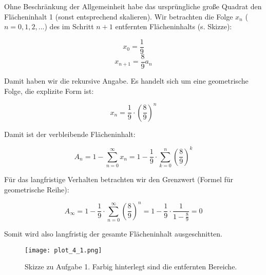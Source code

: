 \item Ohne Beschränkung der Allgemeinheit habe das ursprüngliche große Quadrat den Flächeninhalt 1 (sonst entsprechend skalieren). Wir betrachten die Folge $x_n$ ($n=0,1,2,...$) des im Schritt $n+1$ entfernten Flächeninhalts (s. Skizze):

$$x_0 = \frac{1}{9}$$
$$x_{n+1} = \frac{8}{9} a_n$$

Damit haben wir die rekursive Angabe. Es handelt sich um eine geometrische Folge, die explizite Form ist:

$$x_n = \frac{1}{9} \cdot (\frac{8}{9})^n$$

Damit ist der verbleibende Flächeninhalt:

$$A_n = 1 - \sum_{n=0}^{\infty} {x_n} = 1 - \frac{1}{9} \cdot \sum_{k=0}^{n} {(\frac{8}{9})^k}$$

Für das langfristige Verhalten betrachten wir den Grenzwert (Formel für geometrische Reihe):

$$ A_\infty = 1 - \frac{1}{9} \cdot \sum_{n=0}^{\infty} {(\frac{8}{9})^n} = 1 - \frac{1}{9} \cdot \frac{1}{1-\frac{8}{9}} = 0$$

Somit wird also langfristig der gesamte Flächeninhalt ausgeschnitten.

\begin{figure}[ht]
	\centering
	\texttt{[image: plot\_4\_1.png]}
	\caption{Skizze zu Aufgabe 1. Farbig hinterlegt sind die entfernten Bereiche.}
	\label{fig1}
\end{figure}


